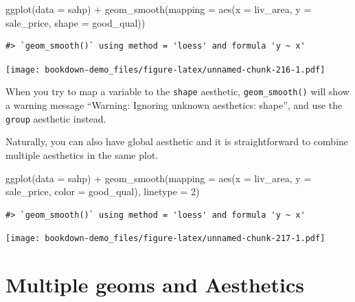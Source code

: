 \documentclass[
]{book}
\newenvironment{Shaded}{\begin{snugshade}}{\end{snugshade}}
\newcommand{\AttributeTok}[1]{\textcolor[rgb]{0.77,0.63,0.00}{#1}}
\newcommand{\DecValTok}[1]{\textcolor[rgb]{0.00,0.00,0.81}{#1}}
\newcommand{\FunctionTok}[1]{\textcolor[rgb]{0.00,0.00,0.00}{#1}}
\newcommand{\NormalTok}[1]{#1}
\newcommand{\SpecialCharTok}[1]{\textcolor[rgb]{0.00,0.00,0.00}{#1}}
\begin{document}
\begin{Shaded}
\begin{Highlighting}[]
\FunctionTok{ggplot}\NormalTok{(}\AttributeTok{data =}\NormalTok{ sahp) }\SpecialCharTok{+} \FunctionTok{geom\_smooth}\NormalTok{(}\AttributeTok{mapping =} \FunctionTok{aes}\NormalTok{(}\AttributeTok{x =}\NormalTok{ liv\_area, }\AttributeTok{y =}\NormalTok{ sale\_price, }\AttributeTok{shape =}\NormalTok{ good\_qual))}
\end{Highlighting}
\end{Shaded}

\begin{verbatim}
#> `geom_smooth()` using method = 'loess' and formula 'y ~ x'
\end{verbatim}

\texttt{[image: bookdown-demo\_files/figure-latex/unnamed-chunk-216-1.pdf]}

When you try to map a variable to the \texttt{shape} aesthetic, \texttt{geom\_smooth()} will show a warning message ``Warning: Ignoring unknown aesthetics: shape'', and use the \texttt{group} aesthetic instead.

Naturally, you can also have global aesthetic and it is straightforward to combine multiple aesthetics in the same plot.

\begin{Shaded}
\begin{Highlighting}[]
\FunctionTok{ggplot}\NormalTok{(}\AttributeTok{data =}\NormalTok{ sahp) }\SpecialCharTok{+} \FunctionTok{geom\_smooth}\NormalTok{(}\AttributeTok{mapping =} \FunctionTok{aes}\NormalTok{(}\AttributeTok{x =}\NormalTok{ liv\_area, }\AttributeTok{y =}\NormalTok{ sale\_price, }\AttributeTok{color =}\NormalTok{ good\_qual), }\AttributeTok{linetype =} \DecValTok{2}\NormalTok{)}
\end{Highlighting}
\end{Shaded}

\begin{verbatim}
#> `geom_smooth()` using method = 'loess' and formula 'y ~ x'
\end{verbatim}

\texttt{[image: bookdown-demo\_files/figure-latex/unnamed-chunk-217-1.pdf]}

\hypertarget{multi-geom}{%
\section{Multiple geoms and Aesthetics}\label{multi-geom}}
\end{document}
